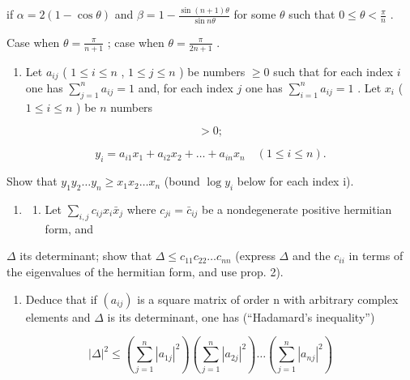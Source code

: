 if \(\alpha = 2(1 - \cos \theta)\) and \(\beta = 1 - \frac{\sin(n + 1)\theta}{\sin n\theta}\) for some \(\theta\) such that \(0\leqslant \theta < \frac{\pi}{n}\) .

Case when \(\theta = \frac{\pi}{n + 1}\) ; case when \(\theta = \frac{\pi}{2n + 1}\) .

\begin{enumerate}
\def\labelenumi{\arabic{enumi})}
\setcounter{enumi}{10}
\tightlist
\item
  Let \(a_{ij}\) ( \(1 \leqslant i \leqslant n\) , \(1 \leqslant j \leqslant n\) ) be numbers \(\geqslant 0\) such that for each index \(i\) one has \(\sum_{j=1}^{n} a_{ij} = 1\) and, for each index \(j\) one has \(\sum_{i=1}^{n} a_{ij} = 1\) . Let \(x_i\) ( \(1 \leqslant i \leqslant n\) ) be \(n\) numbers
\end{enumerate}

\[
> 0;
\]

\[
y _ {i} = a _ {i 1} x _ {1} + a _ {i 2} x _ {2} + \dots + a _ {i n} x _ {n} \quad (1 \leqslant i \leqslant n).
\]

Show that \(y_{1}y_{2}\ldots y_{n}\geqslant x_{1}x_{2}\ldots x_{n}\) (bound \(\log y_{i}\) below for each index i).

\begin{enumerate}
\def\labelenumi{\arabic{enumi})}
\setcounter{enumi}{11}
\tightlist
\item
  \begin{enumerate}
  \def\labelenumii{\alph{enumii})}
  \tightlist
  \item
    Let \(\sum_{i,j} c_{ij} x_i \bar{x}_j\) where \(c_{ji} = \bar{c}_{ij}\) be a nondegenerate positive hermitian form, and
  \end{enumerate}
\end{enumerate}

\(\Delta\) its determinant; show that \(\Delta \leqslant c_{11}c_{22}\ldots c_{nn}\) (express \(\Delta\) and the \(c_{ii}\) in terms of the eigenvalues of the hermitian form, and use prop. 2).

\begin{enumerate}
\def\labelenumi{\alph{enumi})}
\setcounter{enumi}{1}
\tightlist
\item
  Deduce that if \((a_{ij})\) is a square matrix of order n with arbitrary complex elements and \(\Delta\) is its determinant, one has (``Hadamard's inequality'')
\end{enumerate}

\[
\left| \Delta \right| ^ {2} \leqslant \left(\sum_ {j = 1} ^ {n} \left| a _ {1 j} \right| ^ {2}\right) \left(\sum_ {j = 1} ^ {n} \left| a _ {2 j} \right| ^ {2}\right) \dots \left(\sum_ {j = 1} ^ {n} \left| a _ {n j} \right| ^ {2}\right)
\]

